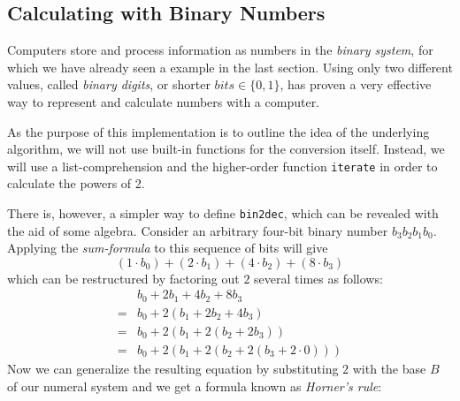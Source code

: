 \subsection{Calculating with Binary Numbers}

Computers store and process information as numbers in the \emph{binary system}, for which we have already seen a example in the last section.
Using only two different values, called \emph{binary digits}, or shorter $bits \in \{0,1\}$, has
proven a very effective way to represent and calculate numbers with a computer.

\begin{impl}
As the purpose of this implementation is to outline the idea of the underlying algorithm, we will not use built-in functions for the conversion itself.
Instead, we will use a list-comprehension and the higher-order function \texttt{iterate} in order to calculate the powers of 2.
\end{impl}


There is, however, a simpler way to define \texttt{bin2dec}, which can be revealed with the aid of some algebra.
Consider an arbitrary four-bit binary number $b_3b_2b_1b_0$.
Applying the \emph{sum-formula} to this sequence of bits will give
\begin{equation*}
(1 \cdot b_0) + (2 \cdot b_1) + (4 \cdot b_2) + (8 \cdot b_3)
\end{equation*}
which can be restructured by factoring out $2$ several times as follows:
\begin{align*}
&b_0+2b_1+4b_2+8b_3 \\
=&b_0+2(b_1+2b_2+4b_3) \\
=&b_0+2(b_1+2(b_2+2b_3)) \\
=&b_0+2(b_1+2(b_2+2(b_3+2 \cdot 0)))
\end{align*}
Now we can generalize the resulting equation by substituting $2$ with the base $B$ of our numeral system and we get a formula known as \emph{Horner's rule}:

